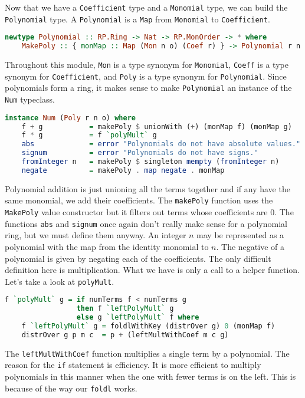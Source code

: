 \documentclass[MS, xcolor=dvipsnames]{wfuthesis}
\theoremstyle{definition}
\begin{document}
Now that we have a \lstinline{Coefficient} type and a \lstinline{Monomial} type, we can build the \lstinline{Polynomial} type. A \lstinline{Polynomial} is a \lstinline{Map} from \lstinline{Monomial} to \lstinline{Coefficient}.
\begin{lstlisting}[language=Haskell]
newtype Polynomial :: RP.Ring -> Nat -> RP.MonOrder -> * where
    MakePoly :: { monMap :: Map (Mon n o) (Coef r) } -> Polynomial r n o
\end{lstlisting}
Throughout this module, \lstinline{Mon} is a type synonym for \lstinline{Monomial}, \lstinline{Coeff} is a type synonym for \lstinline{Coefficient}, and \lstinline{Poly} is a type synonym for \lstinline{Polynomial}. Since polynomials form a ring, it makes sense to make \lstinline{Polynomial} an instance of the \lstinline{Num} typeclass.
\begin{lstlisting}[language=Haskell]
instance Num (Poly r n o) where
    f + g           = makePoly $ unionWith (+) (monMap f) (monMap g)
    f * g           = f `polyMult` g
    abs             = error "Polynomials do not have absolute values."
    signum          = error "Polynomials do not have signs."
    fromInteger n   = makePoly $ singleton mempty (fromInteger n)
    negate          = makePoly . map negate . monMap
\end{lstlisting}
Polynomial addition is just unioning all the terms together and if any have the same monomial, we add their coefficients. The \lstinline{makePoly} function uses the \lstinline{MakePoly} value constructor but it filters out terms whose coefficients are 0. The functions \lstinline{abs} and \lstinline{signum} once again don't really make sense for a polynomial ring, but we must define them anyway. An integer $n$ may be represented as a polynomial with the map from the identity monomial to $n$. The negative of a polynomial is given by negating each of the coefficients. The only difficult definition here is multiplication. What we have is only a call to a helper function. Let's take a look at \lstinline{polyMult}.
\begin{lstlisting}[language=Haskell]
f `polyMult` g = if numTerms f < numTerms g
                 then f `leftPolyMult` g
                 else g `leftPolyMult` f where
    f `leftPolyMult` g = foldlWithKey (distrOver g) 0 (monMap f)
    distrOver g p m c  = p + (leftMultWithCoef m c g)
\end{lstlisting}
The \lstinline{leftMultWithCoef} function multiplies a single term by a polynomial. The reason for the \lstinline{if} statement is efficiency. It is more efficient to multiply polynomials in this manner when the one with fewer terms is on the left. This is because of the way our \lstinline{foldl} works. \par
\end{document}
